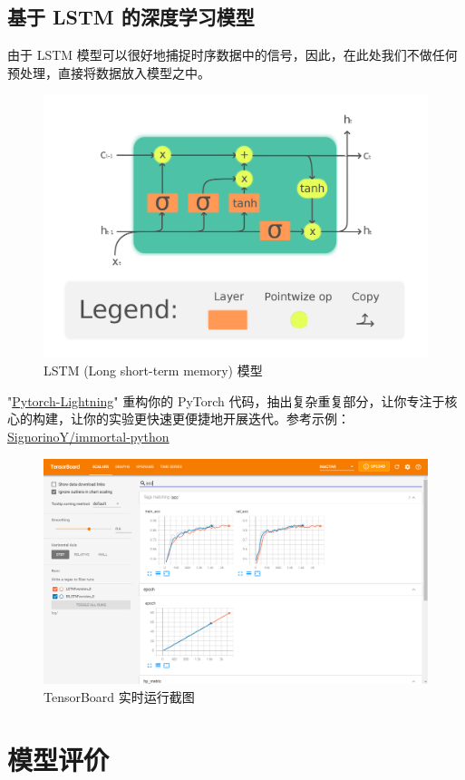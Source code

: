 \documentclass[screen,17pt,cn,founder,mtpro2]{elegantnote}
\begin{document}
\subsection{基于 LSTM 的深度学习模型}

由于 LSTM 模型可以很好地捕捉时序数据中的信号，因此，在此处我们不做任何预处理，直接将数据放入模型之中。

\begin{figure}[hpt]
    \centering
    \includegraphics[width=.5\linewidth]{images/lstm-cell.png}
    \caption{LSTM (Long short-term memory) 模型}
\end{figure}

\begin{note}
    "\href{https://www.pytorchlightning.ai/}{Pytorch-Lightning}" 重构你的 PyTorch 代码，抽出复杂重复部分，让你专注于核心的构建，让你的实验更快速更便捷地开展迭代。参考示例：\href{https://github.com/SignorinoY/immortal-python}{SignorinoY/immortal-python}
\end{note}

\begin{figure}
    \centering
    \includegraphics[width=.9\linewidth]{images/screenshots-of-tensorboard.png}
    \caption{TensorBoard 实时运行截图}
\end{figure}
\clearpage

\section{模型评价}
\end{document}

